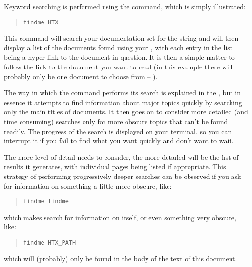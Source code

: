 Keyword searching is performed using the 
command, which is simply illustrated:

\begin{quote}
\begin{verbatim}
findme HTX
\end{verbatim}
\end{quote}

This command will search your documentation set for the string
 and will then display a list of the documents found using
your , with each entry in
the list being a hyper-link to the document in question. It is then a
simple matter to follow the link to the document you want to read (in
this example there will probably only be one document to choose from
-- ).

The way in which the  command performs its search is
explained in the , but in
essence it attempts to find information about major topics quickly by
searching only the main titles of documents. It then goes on to
consider more detailed (and time consuming) searches only for more
obscure topics that can't be found readily. The progress of the search
is displayed on your terminal, so you can interrupt it if you fail to
find what you want quickly and don't want to wait.

The more level of detail  needs to consider, the more
detailed will be the list of results it generates, with individual
 pages being listed if appropriate. This strategy of
performing progressively deeper searches can be observed if you ask
for information on something a little more obscure, like:

\begin{quote}
\begin{verbatim}
findme findme
\end{verbatim}
\end{quote}

which makes  search for information on itself, or even
something very obscure, like:

\begin{quote}
\begin{verbatim}
findme HTX_PATH
\end{verbatim}
\end{quote}

which will (probably) only be found in the body of the text of this
document.

